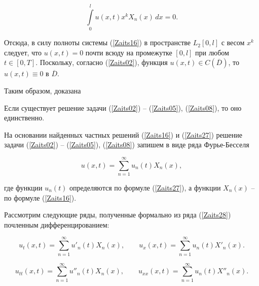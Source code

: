 $$\int\limits_0^l u(x,t)x^kX_n(x)\,dx=0.$$



Отсюда, в силу полноты системы (\ref{Zaits16}) в пространстве $L_2[0,l]$ с весом $x^k$ следует, что $u(x,t)=0$ почти всюду на промежутке $[0,l]$ при любом $t\in[0,T]$. Поскольку, согласно (\ref{Zaits02}), функция $u(x,t)\in C(\overline{D})$, то $u(x,t)\equiv0$ в $\overline{D}$.



Таким образом, доказана



\begin{theorem}[1]

Если существует решение задачи (\ref{Zaits02}) -- (\ref{Zaits05}), (\ref{Zaits08}), то оно единственно.

\end{theorem}










На основании найденных частных решений (\ref{Zaits16}) и (\ref{Zaits27}) решение задачи (\ref{Zaits02}) -- (\ref{Zaits05}), (\ref{Zaits08}) запишем в виде ряда Фурье-Бесселя

\begin{equation}

\label{Zaits28}

u(x,t)=\sum\limits_{n=1}^\infty u_n(t)X_n(x),

\end{equation}

где функции $u_n(t)$ определяются по формуле (\ref{Zaits27}), а функции $X_n(x)$ -- по формуле (\ref{Zaits16}).



Рассмотрим следующие ряды, полученные формально из ряда (\ref{Zaits28}) почленным дифференцированием:

\begin{equation}

\label{Zaits29}

u_t(x,t)=\sum\limits_{n=1}^\infty u'_n(t)X_n(x),\qquad u_x(x,t)=\sum\limits_{n=1}^\infty u_n(t)X'_n(x).

\end{equation}

\begin{equation}

\label{Zaits30}

u_{tt}(x,t)=\sum\limits_{n=1}^\infty u''_n(t)X_n(x),\qquad u_{xx}(x,t)=\sum\limits_{n=1}^\infty u_n(t)X''_n(x).

\end{equation}



